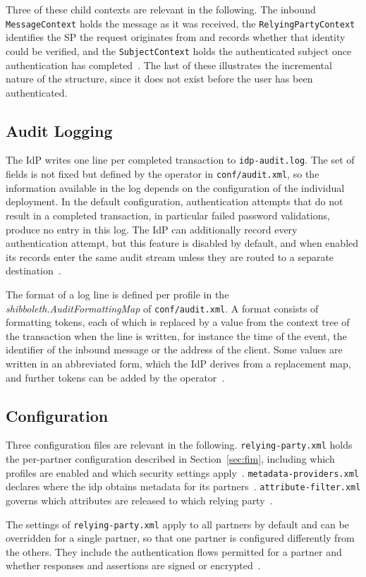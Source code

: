 \documentclass[../main.tex]{subfiles}
\begin{document}
Three of these child contexts are relevant in the following. 
The inbound \texttt{Message\allowbreak{}Context} holds the message as it was received, the 
\texttt{Relying\allowbreak{}Party\allowbreak{}Context} identifies the SP the request originates from 
and records whether that identity could be verified, and the \texttt{Subject\allowbreak{}Context} 
holds the authenticated subject once authentication has completed~\cite{ProfileHandling}. 
The last of these illustrates the incremental nature of the structure, since it does not exist 
before the user has been authenticated.

\subsection{Audit Logging}\label{subsec:audit-logging}

The IdP writes one line per completed transaction to \texttt{idp-audit.log}. 
The set of fields is not fixed but defined by the operator in \texttt{conf/audit.xml}, so the 
information available in the log depends on the configuration of the individual 
deployment. 
In the default configuration, authentication attempts that do not result in a completed transaction, 
in particular failed password validations, produce no entry in this log. 
The IdP can additionally record every authentication attempt, but this feature is disabled by default, 
and when enabled its records enter the same audit stream unless they are routed to a separate 
destination~\cite{AuditLoggingConfiguration}. 

The format of a log line is defined per profile in the \textit{shibboleth.AuditFormattingMap} of 
\texttt{conf/audit.xml}. 
A format consists of formatting tokens, each of which is replaced by a value from the context tree 
of the transaction when the line is written, for instance the time of the event, the identifier of 
the inbound message or the address of the client. 
Some values are written in an abbreviated form, which the IdP derives from a replacement map, 
and further tokens can be added by the operator~\cite{AuditLoggingConfiguration}.

\subsection{Configuration}\label{subsec:config}

Three configuration files are relevant in the following. 
\texttt{relying-party.xml} holds the per-partner configuration described in Section~\ref{sec:fim}, 
including which profiles are enabled and which security settings apply~\cite{RelyingPartyConfiguration}. 
\texttt{metadata-providers.xml} declares where the \acrshort{idp} obtains metadata for 
its partners~\cite{MetadataConfiguration}. 
\texttt{attribute-filter.xml} governs which attributes are released to which 
relying party~\cite{AttributeFilterConfiguration}.

The settings of \texttt{relying-party.xml} apply to all partners by default and can be overridden 
for a single partner, so that one partner is configured differently from the others. 
They include the authentication flows permitted for a partner and whether responses and assertions 
are signed or encrypted~\cite{RelyingPartyConfiguration}. 
\end{document}
